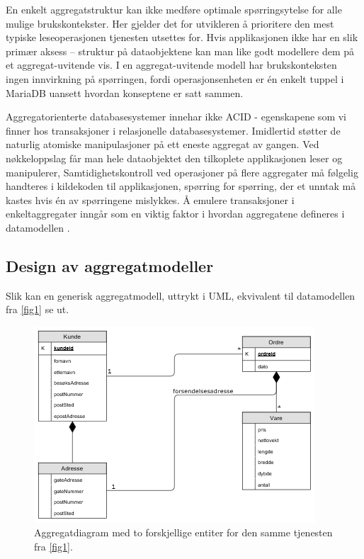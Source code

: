 En enkelt aggregatstruktur kan ikke medføre optimale spørringsytelse for alle mulige brukskontekster. Her gjelder det for utvikleren å prioritere den mest typiske leseoperasjonen tjenesten utsettes for. Hvis applikasjonen ikke har en slik primær aksess – struktur på dataobjektene kan man like godt modellere dem på et aggregat-uvitende vis. I en aggregat-uvitende modell har brukskonteksten ingen innvirkning på spørringen, fordi operasjonsenheten er én enkelt tuppel i MariaDB uansett hvordan konseptene er satt sammen.

Aggregatorienterte databasesystemer innehar ikke ACID - egenskapene som vi finner hos transaksjoner i relasjonelle databasesystemer. Imidlertid støtter de naturlig atomiske manipulasjoner på ett eneste aggregat av gangen. Ved nøkkeloppslag får man hele dataobjektet den tilkoplete applikasjonen leser og manipulerer, Samtidighetskontroll ved operasjoner på flere aggregater må følgelig handteres i kildekoden til applikasjonen, spørring for spørring, der et unntak må kastes hvis én av spørringene mislykkes. Å emulere transaksjoner i enkeltaggregater inngår som en viktig faktor i hvordan aggregatene defineres i datamodellen \citep{sadalage2013}.

\subsection{Design av aggregatmodeller}


Slik kan en generisk aggregatmodell, uttrykt i UML, ekvivalent til datamodellen fra \ref{fig1} se ut.

\begin{figure}[ht]
    \centering
    \includegraphics{fig/NettbutikkAggregatModell.png}
    \caption{Aggregatdiagram med to forskjellige entiter for den samme tjenesten fra \ref{fig1}.}
    \label{fig2}
\end{figure}

